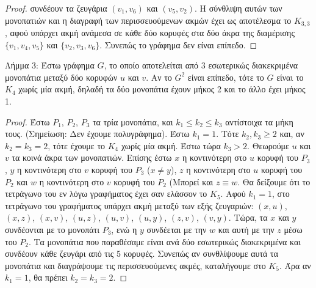 \documentclass[a4paper, oneside, 11pt]{article}
\theoremstyle{definition}
\begin{document}
\begin{enumerate}
\begin{proof}
συνδέουν τα ζευγάρια $(v_1,v_6)$ και $(v_5,v_2)$. Η σύνθλιψη αυτών των μονοπατιών και η διαγραφή των περισσευούμενων ακμών έχει ως αποτέλεσμα το $K_{3,3}$, αφού υπάρχει ακμή ανάμεσα σε κάθε δύο κορυφές
στα δύο άκρα της διαμέρισης $\{v_1,v_4,v_5\}$ και $\{v_2,v_3,v_6\}$. Συνεπώς το γράφημα δεν είναι επίπεδο.
	\end{proof}
Λήμμα 3: Έστω γράφημα $G$, το οποίο αποτελείται από 3 εσωτερικώς διακεκριμένα μονοπάτια μεταξύ δύο κορυφών $u$ και $v$. Αν το $G^2$ είναι επίπεδο, τότε το $G$ είναι το $K_4$ χωρίς μία ακμή, δηλαδή τα 
δύο μονοπάτια έχουν μήκος 2 και το άλλο έχει μήκος 1.
	\begin{proof}
Έστω $P_1$, $P_2$, $P_3$ τα τρία μονοπάτια, και $k_1\leq k_2\leq k_3$ αντίστοιχα τα μήκη τους. (Σημείωση: Δεν έχουμε πολυγράφημα). Έστω $k_1=1$. Τότε $k_2,k_3\geq 2$ και, αν $k_2=k_3=2$, τότε 
έχουμε το $K_4$ χωρίς μία ακμή. Έστω τώρα $k_3>2$. Θεωρούμε $u$ και $v$ τα κοινά άκρα των μονοπατιών. Επίσης έστω $x$ η κοντινότερη στο $u$ κορυφή του $P_3$, $y$ η κοντινότερη στο $v$ 
κορυφή του $P_3$ ($x\neq y$), $z$
η κοντινότερη στο $u$ κορυφή του $P_2$ και $w$ η κοντινότερη στο $v$ κορυφή του $P_2$ (Μπορεί και $z\equiv w$. 
Θα δείξουμε ότι το τετράγωνο του εν λόγω γραφήματος έχει σαν ελάσσον το $K_5$. Αφού $k_1=1$, στο τετράγωνο του γραφήματος υπάρχει ακμή μεταξύ των εξής ζευγαριών:
$(x,u)$, $(x,z)$, $(x,v)$, $(u,z)$, $(u,v)$, $(u,y)$, $(z,v)$, $(v,y)$. Τώρα, τα $x$ και $y$ συνδέονται με το μονοπάτι $P_3$, ενώ η $y$ συνδέεται με την $w$ και αυτή με την $z$ μέσω του $P_2$. Τα
μονοπάτια που παραθέσαμε είναι ανά δύο εσωτερικώς διακεκριμένα και συνδέουν κάθε ζευγάρι από τις 5 κορυφές. Συνεπώς αν συνθλίψουμε αυτά τα μονοπάτια και διαγράψουμε τις περισσευούμενες ακμές,
καταλήγουμε στο $K_5$. Άρα αν $k_1=1$, θα πρέπει $k_2=k_3=2$. 


\end{proof}
\end{enumerate}
\end{document}
